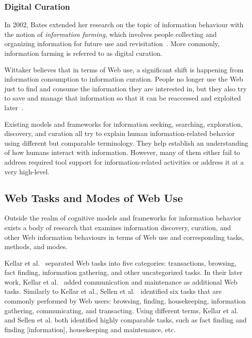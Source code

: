 \documentclass{sigchi}
\begin{document}
\subsubsection{Digital Curation}
In 2002, Bates extended her research on the topic of information behaviour with the notion of \textit{information farming}, which involves people collecting and organizing information for future use and revisitation~\cite{bates2002toward}. More commonly, information farming is referred to as digital curation. 

Wittaker believes that in terms of Web use, a significant shift is happening from information consumption to information curation. People no longer use the Web just to find and consume the information they are interested in, but they also try to save and manage that information so that it can be reaccessed and exploited later~\cite{whittaker2011personal}. 

Existing models and frameworks for information seeking, searching, exploration, discovery, and curation all try to explain human information-related behavior using different but comparable terminology. They help establish an understanding of how humans interact with information. However, many of them either fail to address required tool support for information-related activities or address it at a very high-level.  

\subsection{Web Tasks and Modes of Web Use}
Outside the realm of cognitive models and frameworks for information behavior exists a body of research that examines information discovery, curation, and other Web information behaviours in terms of Web use and corresponding tasks, methods, and modes.

Kellar et al.~\cite{kellar2006goal} separated Web tasks into five categories: transactions, browsing, fact finding, information gathering, and other uncategorized tasks. In their later work, Kellar et al.~\cite{kellar2007field} added communication and maintenance as additional Web tasks. Similarly to Kellar et al., Sellen et al.~\cite{sellen2002knowledge} identified six tasks that are commonly performed by Web users: browsing, finding, housekeeping, information gathering, communicating, and transacting. Using different terms, Kellar et al. and Sellen et al. both identified highly comparable tasks, such as fact finding and finding [information], housekeeping and maintenance, etc. 
\end{document}

